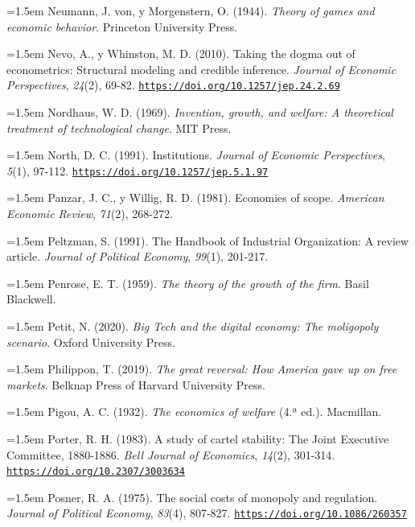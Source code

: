 \documentclass[10pt,a4paper]{article}
\begin{document}
\noindent\hangindent=1.5em Neumann, J. von, y Morgenstern, O. (1944). \textit{Theory of games and economic behavior}. Princeton University Press.

\noindent\hangindent=1.5em Nevo, A., y Whinston, M. D. (2010). Taking the dogma out of econometrics: Structural modeling and credible inference. \textit{Journal of Economic Perspectives}, \textit{24}(2), 69-82. \href{https://doi.org/10.1257/jep.24.2.69}{\nolinkurl{https://doi.org/10.1257/jep.24.2.69}}

\noindent\hangindent=1.5em Nordhaus, W. D. (1969). \textit{Invention, growth, and welfare: A theoretical treatment of technological change}. MIT Press.

\noindent\hangindent=1.5em North, D. C. (1991). Institutions. \textit{Journal of Economic Perspectives}, \textit{5}(1), 97-112. \href{https://doi.org/10.1257/jep.5.1.97}{\nolinkurl{https://doi.org/10.1257/jep.5.1.97}}

\noindent\hangindent=1.5em Panzar, J. C., y Willig, R. D. (1981). Economies of scope. \textit{American Economic Review}, \textit{71}(2), 268-272.

\noindent\hangindent=1.5em Peltzman, S. (1991). The Handbook of Industrial Organization: A review article. \textit{Journal of Political Economy}, \textit{99}(1), 201-217.

\noindent\hangindent=1.5em Penrose, E. T. (1959). \textit{The theory of the growth of the firm}. Basil Blackwell.

\noindent\hangindent=1.5em Petit, N. (2020). \textit{Big Tech and the digital economy: The moligopoly scenario}. Oxford University Press.

\noindent\hangindent=1.5em Philippon, T. (2019). \textit{The great reversal: How America gave up on free markets}. Belknap Press of Harvard University Press.

\noindent\hangindent=1.5em Pigou, A. C. (1932). \textit{The economics of welfare} (4.ª ed.). Macmillan.

\noindent\hangindent=1.5em Porter, R. H. (1983). A study of cartel stability: The Joint Executive Committee, 1880-1886. \textit{Bell Journal of Economics}, \textit{14}(2), 301-314. \href{https://doi.org/10.2307/3003634}{\nolinkurl{https://doi.org/10.2307/3003634}}

\noindent\hangindent=1.5em Posner, R. A. (1975). The social costs of monopoly and regulation. \textit{Journal of Political Economy}, \textit{83}(4), 807-827. \href{https://doi.org/10.1086/260357}{\nolinkurl{https://doi.org/10.1086/260357}}
\end{document}
